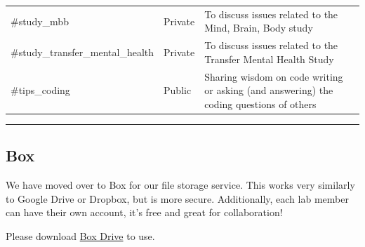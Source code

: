 \documentclass[]{book}
\begin{document}
\begin{longtable}[]{@{}lll@{}}
\begin{minipage}[t]{0.18\columnwidth}\raggedright
\#study\_mbb\strut
\end{minipage} & \begin{minipage}[t]{0.04\columnwidth}\raggedright
Private\strut
\end{minipage} & \begin{minipage}[t]{0.70\columnwidth}\raggedright
To discuss issues related to the Mind, Brain, Body study\strut
\end{minipage}\tabularnewline
\begin{minipage}[t]{0.18\columnwidth}\raggedright
\#study\_transfer\_mental\_health\strut
\end{minipage} & \begin{minipage}[t]{0.04\columnwidth}\raggedright
Private\strut
\end{minipage} & \begin{minipage}[t]{0.70\columnwidth}\raggedright
To discuss issues related to the Transfer Mental Health Study\strut
\end{minipage}\tabularnewline
\begin{minipage}[t]{0.18\columnwidth}\raggedright
\#tips\_coding\strut
\end{minipage} & \begin{minipage}[t]{0.04\columnwidth}\raggedright
Public\strut
\end{minipage} & \begin{minipage}[t]{0.70\columnwidth}\raggedright
Sharing wisdom on code writing or asking (and answering) the coding questions of others\strut
\end{minipage}\tabularnewline
\bottomrule
\end{longtable}

\begin{center}\rule{0.5\linewidth}{\linethickness}\end{center}

\hypertarget{box}{%
\subsection{Box}\label{box}}

We have moved over to Box for our file storage service. This works very similarly to Google Drive or Dropbox, but is more secure. Additionally, each lab member can have their own account, it's free and great for collaboration!

Please download \href{https://www.box.com/drive}{Box Drive} to use.
\end{document}
